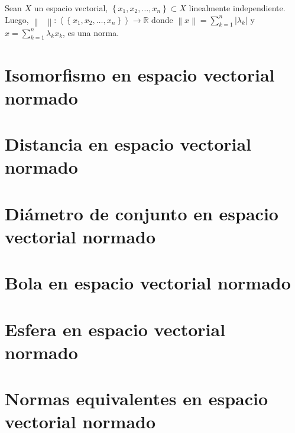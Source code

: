 \begin{prob}
    \label{prob10}
    Sean $X$ un espacio vectorial,
    \begin{math}
        \left\{
        x_{1},
        x_{2},
        \dotsc,
        x_{n}
        \right\}\subset X
    \end{math}
    linealmente independiente.
    Luego,
    \begin{math}
        \left\|
        \phantom{\cdot}
        \right\|\colon
        \left\langle
        \left\{
        x_{1},
        x_{2},
        \dotsc,
        x_{n}
        \right\}
        \right\rangle\to
        \mathbb{R}
    \end{math}
    donde
    \begin{math}
        \left\|
        x
        \right\|=
        \sum_{k=1}^{n}
        \left|
        \lambda_{k}
        \right|
    \end{math}
    y
    \begin{math}
        x=
        \sum_{k=1}^{n}
        \lambda_{k}x_{k}
    \end{math},
    es una norma.
\end{prob}



\section{Isomorfismo en espacio vectorial normado}

\section{Distancia en espacio vectorial normado}

\section{Diámetro de conjunto en espacio vectorial normado}

\section{Bola en espacio vectorial normado}

\section{Esfera en espacio vectorial normado}

\section{Normas equivalentes en espacio vectorial normado}

